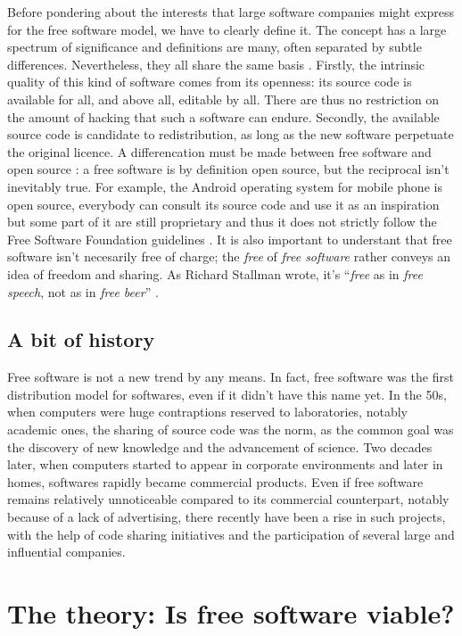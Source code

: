 \documentclass[12pt]{article}
\begin{document}
Before pondering about the interests that large software companies
might express for the free software model, we have to clearly define
it. The concept has a large spectrum of significance and definitions
are many, often separated by subtle differences. Nevertheless, they
all share the same basis \cite{sers}. Firstly, the intrinsic quality
of this kind of software comes from its openness: its source code is
available for all, and above all, editable by all. There are thus no
restriction on the amount of hacking that such a software can
endure. Secondly, the available source code is candidate to
redistribution, as long as the new software perpetuate the original
licence. A differencation must be made between free software and open
source : a free software is by definition open source, but the
reciprocal isn't inevitably true. For example, the Android operating
system for mobile phone is open source, everybody can consult its
source code and use it as an inspiration but some part of it are still
proprietary and thus it does not strictly follow the Free Software
Foundation guidelines \cite{and}. It is also important to understant
that free software isn't necesarily free of charge; the \textit{free}
of \textit{free software} rather conveys an idea of freedom and
sharing. As Richard Stallman wrote, it's ``\textit{free} as in
\textit{free speech}, not as in \textit{free beer}'' \cite{free}.

\subsection{A bit of history}

Free software is not a new trend by any means. In fact, free software
was the first distribution model for softwares, even if it didn't have
this name yet. In the 50s, when computers were huge contraptions
reserved to laboratories, notably academic ones, the sharing of source
code was the norm, as the common goal was the discovery of new
knowledge and the advancement of science. Two decades later, when
computers started to appear in corporate environments and later in
homes, softwares rapidly became commercial products. Even if free
software remains relatively unnoticeable compared to its commercial
counterpart, notably because of a lack of advertising, there recently
have been a rise in such projects, with the help of code sharing
initiatives and the participation of several large and influential
companies.

\section{The theory: Is free software viable?}
\end{document}
